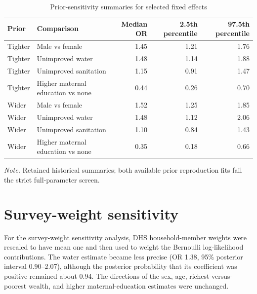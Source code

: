 \documentclass[10pt]{article}
\begin{document}
\begin{table}[H]
\centering
\caption{Prior-sensitivity summaries for selected fixed effects}
\small
\begin{tabular}{llrrr}
\toprule
Prior & Comparison & Median OR & 2.5th percentile & 97.5th percentile \\
\midrule
Tighter & Male vs female & 1.45 & 1.21 & 1.76 \\
Tighter & Unimproved water & 1.48 & 1.14 & 1.88 \\
Tighter & Unimproved sanitation & 1.15 & 0.91 & 1.47 \\
Tighter & Higher maternal education vs none & 0.44 & 0.26 & 0.70 \\
Wider & Male vs female & 1.52 & 1.25 & 1.85 \\
Wider & Unimproved water & 1.48 & 1.12 & 2.06 \\
Wider & Unimproved sanitation & 1.10 & 0.84 & 1.43 \\
Wider & Higher maternal education vs none & 0.35 & 0.18 & 0.66 \\
\bottomrule
\end{tabular}
\begin{minipage}{0.98\textwidth}\footnotesize \textit{Note.} Retained historical summaries; both available prior reproduction fits fail the strict full-parameter screen.\end{minipage}
\end{table}

\section{Survey-weight sensitivity}

For the survey-weight sensitivity analysis, DHS household-member weights were rescaled to have mean one and then used to weight the Bernoulli log-likelihood contributions. The water estimate became less precise (OR 1.38, 95\% posterior interval 0.90--2.07), although the posterior probability that its coefficient was positive remained about 0.94. The directions of the sex, age, richest-versus-poorest wealth, and higher maternal-education estimates were unchanged.
\end{document}
